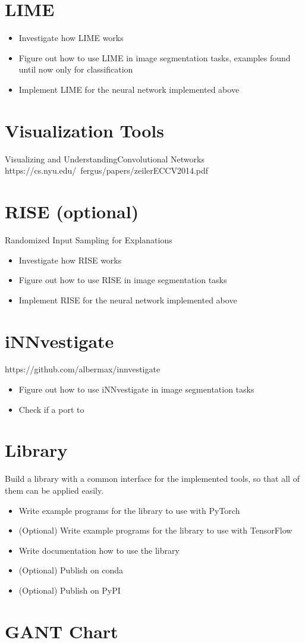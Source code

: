 \section{LIME}
\begin{itemize}
    \item Investigate how LIME works
    \item Figure out how to use LIME in image segmentation tasks, examples found until now only for classification
    \item Implement LIME for the neural network implemented above
\end{itemize}

\section{Visualization Tools}
Visualizing and UnderstandingConvolutional Networks
https://cs.nyu.edu/~fergus/papers/zeilerECCV2014.pdf

\section{RISE (optional)}
Randomized Input Sampling for Explanations
\begin{itemize}
    \item Investigate how RISE works
    \item Figure out how to use RISE in image segmentation tasks
    \item Implement RISE for the neural network implemented above
\end{itemize}

\section{iNNvestigate}
https://github.com/albermax/innvestigate

\begin{itemize}
    \item Figure out how to use iNNvestigate in image segmentation tasks
    \item Check if a port to 
\end{itemize}

\section{Library}
Build a library with a common interface for the implemented tools, so that all of them can be applied easily.
\begin{itemize}
    \item Write example programs for the library to use with PyTorch
    \item (Optional) Write example programs for the library to use with TensorFlow
    \item Write documentation how to use the library
    \item (Optional) Publish on conda
    \item (Optional) Publish on PyPI
    
\end{itemize}

\section{GANT Chart}
